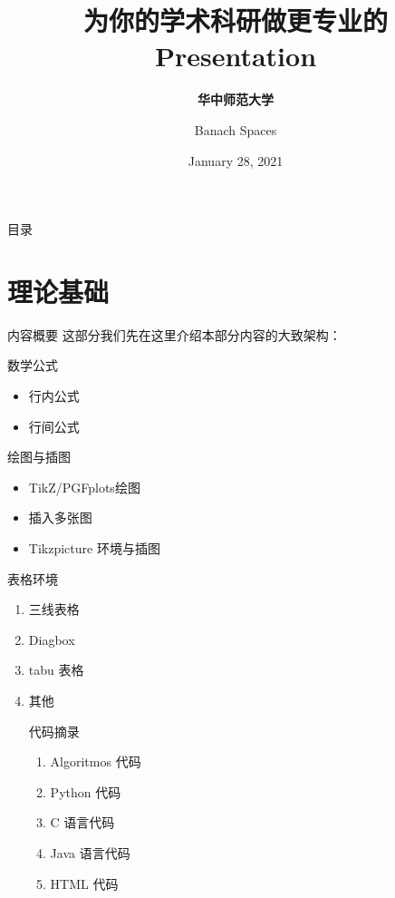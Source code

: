 \documentclass{libs/ccnu_format}
\title[\LaTeX{}与科研]{\huge\bfseries{为你的学术科研做更专业的 Presentation}}
\subtitle{\bfseries 华中师范大学}
\author{Banach Spaces}
\institute[CCNU]{
    \normalsize{\email{yongxuel487@foxmail.com}}
    \newline
    \department{数学与统计学学院}
    \newline
    \ccnu
}
\date{January 28, 2021}
\begin{document}


\begin{frame}{}
    \maketitle
\end{frame}
\kaishu
\begin{frame}{目\quad 录}
\begin{multicols}{2}
        \tableofcontents
\end{multicols}
\end{frame}

\section{理论基础}
\begin{frame}{内容概要}
这部分我们先在这里介绍本部分内容的大致架构：
\begin{multicols}{2}

数学公式
    \begin{itemize}
        \item 行内公式
        \item 行间公式
    \end{itemize}

\vspace{0.2cm}

绘图与插图

    \begin{itemize}
        \item TikZ/PGFplots绘图
        \item 插入多张图
        \item Tikzpicture 环境与插图
    \end{itemize}

\vspace{0.2cm}
表格环境
    \begin{enumerate}
    \item 三线表格
    \item Diagbox
    \item tabu 表格
    \item 其他
    
    \vspace{0.2cm}
    代码摘录
    \begin{enumerate}
    \item Algoritmos 代码
    \item Python 代码
    \item C 语言代码
    \item Java 语言代码
    \item HTML 代码
\end{enumerate}

    \end{enumerate}
\end{multicols}
\end{frame}
\end{document}
